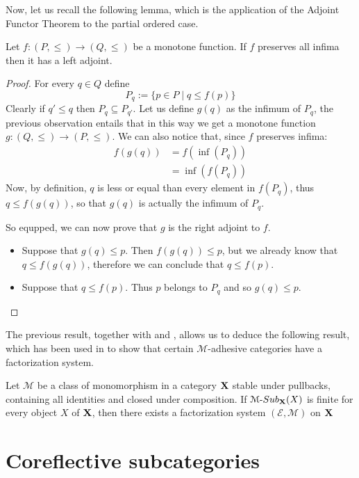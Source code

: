 \documentclass[a4paper,UKenglish,cleveref,pdftex,thm-restate,numberwithinsect]{lipics-v2021}
\def\X{\textbf {\textup{X}}}
\newcommand{\sub}[3]{{\mathcal{#1}}\textrm{-}\mathsf{Sub}_{\textbf {\textup{#2}}}(#3)}
\begin{document}
Now, let us recall the following lemma, which is the application of the Adjoint Functor Theorem to the partial ordered case.

\begin{lemma}\label{lem:adj}
	Let $f\colon (P,\leq)\to (Q, \leq)$ be a monotone function. If $f$ preserves all infima then it has a left adjoint.
\end{lemma}
\begin{proof}
	For every $q\in Q$ define
	\[P_q:=\{p\in P \mid q \leq f(p)\}\]
	Clearly if $q'\leq q$ then $P_{q}\subseteq P_{q'}$. Let us define $g(q)$ as the infimum of $P_q$, the previous observation entails that in this way we get a monotone function $g\colon (Q, \leq)\to (P, \leq)$.
	We can also notice that, since $f$ preserves infima:
	\begin{align*}
		f(g(q))&=f(\inf(P_q))\\&=\inf(f(P_q))
	\end{align*}
	Now, by definition, $q$ is less or equal than every element in $f(P_q)$, thus $q\leq f(g(q))$, so that $g(q)$ is actually the infimum of $P_q$. 
	
	So equpped, we can now prove that $g$ is the right adjoint to $f$.
	\begin{itemize}
		\item Suppose that $g(q)\leq p$.  Then $f(g(q))\leq p$, but we already know that $q\leq f(g(q))$, therefore we can conclude that $q\leq f(p)$.
		\item  Suppose that $q\leq f(p)$. Thus $p$ belongs to $P_q$ and so $g(q)\leq p$. \qedhere 
	\end{itemize}
\end{proof}

The previous result, together with  and , allows us to deduce the following result, which has been used in \cite{baldan2011lattice,braatz2010finitary} to show that certain $\mathcal{M}$-adhesive categories have a factorization system.

\begin{corollary}\label{cor:fin}
	Let $\mathcal{M}$ be a class of monomorphism in a category $\X$ stable under pullbacks, containing all identities and closed under composition. If $\sub{M}{X}{X}$ is finite for every object $X$ of $\X$, then there exists a factorization system $(\mathcal{E},\mathcal{M})$ on $\X$
\end{corollary}


\section{Coreflective subcategories}
\end{document}
